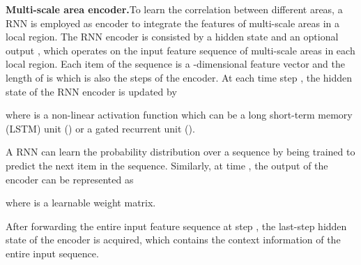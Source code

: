 \documentclass[letterpaper]{article}
\begin{document}
\noindent
\newline
\textbf{Multi-scale area encoder.}\quad To learn the correlation between different areas, a RNN is employed as encoder to integrate the features of multi-scale areas in a local region. The RNN encoder is consisted by a hidden state  and an optional output , which operates on the input feature sequence  of multi-scale areas in each local region. Each item  of the sequence  is a -dimensional feature vector and the length of  is  which is also the steps of the encoder.  
At each time step , the hidden state  of the RNN encoder is updated by

where  is a non-linear activation function which can be a long short-term memory (LSTM) unit (\citealt{hochreiter1997long}) or a gated recurrent unit (\citealt{cho2014learning}).

A RNN can learn the probability distribution over a sequence by being trained to predict the next item in the sequence.
Similarly, at time , the output  of the encoder can be represented as

where  is a learnable weight matrix. 

After forwarding the entire input feature sequence at step , the last-step  hidden state  of the encoder is acquired, which contains the context information of the entire input sequence.
\end{document}
